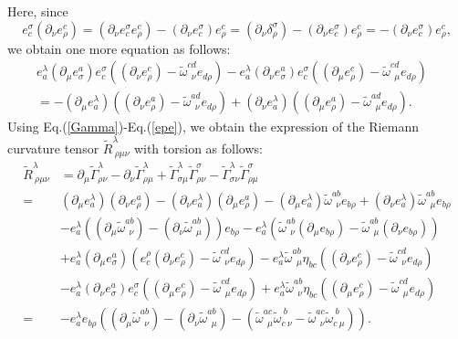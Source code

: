 Here, since 
\begin{equation}
e_c^\sigma(\partial_\nu e_\rho^c) = (\partial_\nu e_c^\sigma e_\rho^c)-(\partial_\nu e_c^\sigma)e_\rho^c =
(\partial_\nu \delta_\rho^\sigma)-(\partial_\nu e_c^\sigma)e_\rho^c=-(\partial_\nu e_c^\sigma)e_\rho^c, 
\end{equation}
we obtain one more equation as follows:
\begin{align}
e_a^\lambda(\partial_\mu e_\sigma^a)e_c^\sigma\left((\partial_\nu e_\rho^c)
-\tilde{\omega}^{cd}_{\ \ \nu}e_{d\rho}\right)
-e_a^\lambda(\partial_\nu e_\sigma^a)e_c^\sigma\left((\partial_\mu e_\rho^c)
-\tilde{\omega}^{cd}_{\ \ \mu}e_{d\rho}\right) & \nonumber \\
= -(\partial_\mu e_a^\lambda)
\left(
(\partial_\nu e_\rho^a)-\tilde{\omega}^{ad}_{\ \ \nu}e_{d\rho}
\right)
 +(\partial_\nu e_a^\lambda)\left((\partial_\mu e_\rho^a)
 -\tilde{\omega}^{ad}_{\ \ \mu}e_{d\rho}\right). & \label{epe}
\end{align}
Using Eq.(\ref{Gamma})-Eq.(\ref{epe}), we obtain the expression of the Riemann curvature tensor $\tilde{R}^\lambda_{\ \rho\mu\nu}$ 
with torsion as follows:
\begin{align}
\tilde{R}^\lambda_{\ \rho\mu\nu} & =
\partial_\mu\tilde{\Gamma}^\lambda_{\rho\nu}-\partial_\nu\tilde{\Gamma}^\lambda_{\rho\mu}
+\tilde{\Gamma}^\lambda_{\sigma\mu}\tilde{\Gamma}^\sigma_{\rho\nu}
-\tilde{\Gamma}^\lambda_{\sigma\nu}\tilde{\Gamma}^\sigma_{\rho\mu} \nonumber \\
= & (\partial_\mu e_a^\lambda)(\partial_\nu e_\rho^a)-(\partial_\nu e_a^\lambda)(\partial_\mu e_\rho^a)
-(\partial_\mu e_a^\lambda)\tilde{\omega}^{ab}_{\ \ \nu}e_{b\rho}
+(\partial_\nu e_a^\lambda)\tilde{\omega}^{ab}_{\ \ \mu}e_{b\rho} \nonumber \\
& - e_a^\lambda\left((\partial_\mu\tilde{\omega}^{ab}_{\ \ \nu})
-(\partial_\nu\tilde{\omega}^{ab}_{\ \ \mu})\right)e_{b\rho}
- e_a^\lambda\left(\tilde{\omega}^{ab}_{\ \ \nu}(\partial_\mu e_{b\rho})
-\tilde{\omega}^{ab}_{\ \ \mu}(\partial_\nu e_{b\rho})\right)\nonumber\\
& +e_a^\lambda(\partial_\mu e_\sigma^a)(e_c^\rho(\partial_\nu e_\rho^c)-\tilde{\omega}^{cd}_{\ \ \nu}e_{d\rho})
-e_a^\lambda \tilde{\omega}^{ab}_{\ \ \mu}\eta_{bc}\left((\partial_\nu e_\rho^c)-\tilde{\omega}^{cd}_{\ \ \nu}e_{d\rho}\right)
\nonumber \\
& -e_a^\lambda(\partial_\nu e_\sigma^a)e_c^\sigma\left((\partial_\mu e_\rho^c)-\tilde{\omega}^{cd}_{\ \ \mu}e_{d\rho}\right) 
+e_a^\lambda \tilde{\omega}^{ab}_{\ \ \nu}\eta_{bc}\left((\partial_\mu e_\rho^c)-\tilde{\omega}^{cd}_{\ \ \mu}e_{d \rho}\right) 
\nonumber \\
= & -e_a^\lambda e_{b \rho} \left(
(\partial_\mu\tilde{\omega}^{ab}_{\ \ \nu})-(\partial_\nu\tilde{\omega}^{ab}_{\ \ \mu})
-(\tilde{\omega}^{ac}_{\ \ \mu}\tilde{\omega}_{c\ \nu}^{\ b}
-\tilde{\omega}^{ac}_{\ \ \nu}\tilde{\omega}_{c\ \mu}^{\ b})
\right). \label{tildeR}
\end{align}
